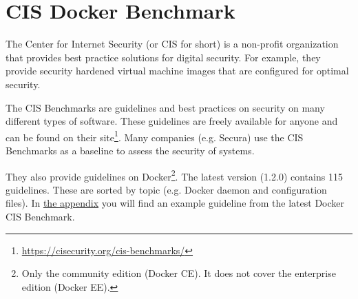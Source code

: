 \section{CIS Docker Benchmark}
The Center for Internet Security (or CIS for short) is a non-profit organization that provides best practice solutions for digital security. For example, they provide security hardened virtual machine images that are configured for optimal security.

\medskip

The CIS Benchmarks are guidelines and best practices on security on many different types of software. These guidelines are freely available for anyone and can be found on their site\footnote{\url{https://cisecurity.org/cis-benchmarks/}}. Many companies (e.g. Secura) use the CIS Benchmarks as a baseline to assess the security of systems.

\medskip

They also provide guidelines on Docker\footnote{Only the community edition (Docker CE). It does not cover the enterprise edition (Docker EE).}. The latest version (1.2.0) contains 115 guidelines. These are sorted by topic (e.g. Docker daemon and configuration files). In \hyperref[appendix:CIS-Benchmark-Example]{the appendix} you will find an example guideline from the latest Docker CIS Benchmark.
